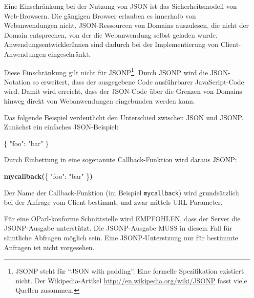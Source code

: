 \documentclass[,a4paper]{article}
\newenvironment{Shaded}{}{}
\newcommand{\DataTypeTok}[1]{\textcolor[rgb]{0.56,0.13,0.00}{{#1}}}
\newcommand{\StringTok}[1]{\textcolor[rgb]{0.25,0.44,0.63}{{#1}}}
\newcommand{\FunctionTok}[1]{\textcolor[rgb]{0.02,0.16,0.49}{{#1}}}
\newcommand{\ErrorTok}[1]{\textcolor[rgb]{1.00,0.00,0.00}{\textbf{{#1}}}}
\begin{document}

Eine Einschränkung bei der Nutzung von JSON ist das Sicherheitsmodell
von Web-Browsern. Die gängigen Browser erlauben es innerhalb von
Webanwendungen nicht, JSON-Ressourcen von Domains auszulesen, die nicht
der Domain entsprechen, von der die Webanwendung selbst geladen wurde.
AnwendungsentwicklerInnen sind dadurch bei der Implementierung von
Client-Anwendungen eingeschränkt.

Diese Einschränkung gilt nicht für JSONP\footnote{JSONP steht für ``JSON
  with padding''. Eine formelle Spezifikation existiert nicht. Der
  Wikipedia-Artikel \url{http://en.wikipedia.org/wiki/JSONP} fasst viele
  Quellen zusammen.}. Durch JSONP wird die JSON-Notation so erweitert,
dass der ausgegebene Code ausführbarer JavaScript-Code wird. Damit wird
erreicht, dass der JSON-Code über die Grenzen von Domains hinweg direkt
von Webanwendungen eingebunden werden kann.

Das folgende Beispiel verdeutlicht den Unterschied zwischen JSON und
JSONP. Zunächst ein einfaches JSON-Beispiel:

\begin{Shaded}
\begin{Highlighting}[]
\FunctionTok{\{}
    \DataTypeTok{"foo"}\FunctionTok{:} \StringTok{"bar"}
\FunctionTok{\}}
\end{Highlighting}
\end{Shaded}

Durch Einbettung in eine sogenannte Callback-Funktion wird daraus JSONP:

\begin{Shaded}
\begin{Highlighting}[]
\ErrorTok{mycallback(}\FunctionTok{\{}
    \DataTypeTok{"foo"}\FunctionTok{:} \StringTok{"bar"}
\FunctionTok{\}}\ErrorTok{)}
\end{Highlighting}
\end{Shaded}

Der Name der Callback-Funktion (im Beispiel \texttt{mycallback}) wird
grundsätzlich bei der Anfrage vom Client bestimmt, und zwar mittels
URL-Parameter.

Für eine OParl-konforme Schnittstelle wird EMPFOHLEN, dass der Server
die JSONP-Ausgabe unterstützt. Die JSONP-Ausgabe MUSS in diesem Fall für
sämtliche Abfragen möglich sein. Eine JSONP-Unterstzung nur für
bestimmte Anfragen ist nicht vorgesehen.
\end{document}
